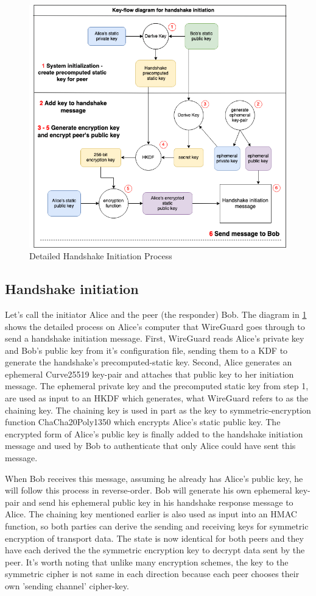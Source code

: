 \documentclass [11pt, proquest] {uwthesis}[2020/02/24]
\begin{document}
\begin{figure}[ht]
\includegraphics[width=15cm]{paper/images/key-flow-wg.png}
\caption{Detailed Handshake Initiation Process}
\label{fig:keyflow}
\end{figure}
\subsection{Handshake initiation}
\label{handinit}
Let's call the initiator Alice and the peer (the responder) Bob.
The diagram in \ref{fig:keyflow} shows the detailed process on Alice's computer that WireGuard goes through to send a handshake initiation message. First, WireGuard reads Alice's private key and Bob's public key from it's configuration file, sending them to a KDF to generate the handshake's precomputed-static key. Second, Alice generates an ephemeral Curve25519 key-pair and attaches that public key to her initiation message. The ephemeral private key and the precomputed static key from step 1, are used as input to an HKDF which generates, what WireGuard refers to as the chaining key. The chaining key is used in part as the key to symmetric-encryption function ChaCha20Poly1350 which encrypts Alice's static public key. The encrypted form of Alice's public key is finally added to the handshake initiation message and used by Bob to authenticate that only Alice could have sent this message.

When Bob receives this message, assuming he already has Alice's public key, he will follow this process in reverse-order. Bob will generate his own ephemeral key-pair and send his ephemeral public key in his handshake response message to Alice. The chaining key mentioned earlier is also used as input into an HMAC function, so both parties can derive the sending and receiving keys for symmetric encryption of transport data.
The state is now identical for both peers and they have each derived the the symmetric encryption key to decrypt data sent by the peer. It's worth noting that unlike many encryption schemes, the key to the symmetric cipher is not same in each direction because each peer chooses their own 'sending channel' cipher-key.
\end{document}
